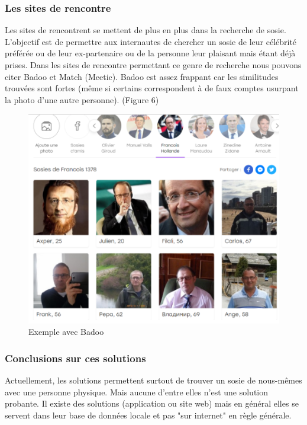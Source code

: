 \documentclass[a4paper,12pt]{article}
\begin{document}
\subsubsection{Les sites de rencontre}
Les sites de rencontrent se mettent de plus en plus dans la recherche de sosie. L'objectif est de permettre aux internautes de chercher un sosie de leur célébrité préférée ou de leur ex-partenaire ou de la personne leur plaisant mais étant déjà prises. Dans les sites de rencontre permettant ce genre de recherche nous pouvons citer Badoo et Match (Meetic). 
Badoo est assez frappant car les similitudes trouvées sont fortes (même si certains correspondent à de faux comptes usurpant la photo d'une autre personne). (Figure 6)
\begin{figure}[!ht]
    \centering
        \includegraphics[scale=1]{images/badoo.PNG}
        \caption{Exemple avec Badoo}
    \end{figure}
    
\subsubsection{Conclusions sur ces solutions}

Actuellement, les solutions permettent surtout de trouver un sosie de nous-mêmes avec une personne physique. Mais aucune d'entre elles n'est une solution probante. Il existe des solutions (application ou site web) mais en général elles se servent dans leur base de données locale et pas "sur internet" en règle générale. 
\end{document}
